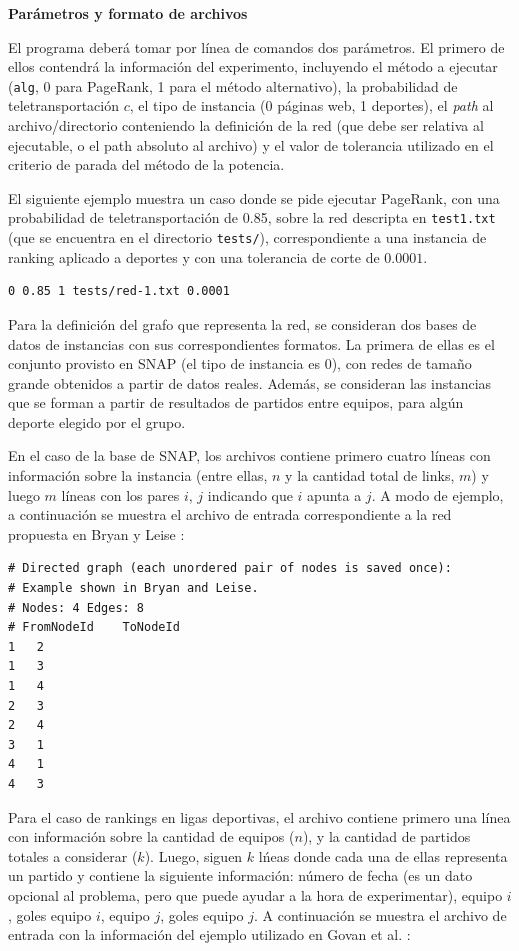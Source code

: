 \documentclass[11pt, a4paper]{article}
\begin{document}
\vskip 5pt
\noindent\textbf{Par\'ametros y formato de archivos}
\vskip 5pt

El programa deber\'a tomar por l\'inea de comandos dos par\'ametros. El primero de ellos contendr\'a la informaci\'on del experimento, incluyendo
el m\'etodo a ejecutar (\verb+alg+, 0 para PageRank, 1 para el m\'etodo alternativo), la probabilidad de teletransportaci\'on $c$, el tipo de instancia
(0 p\'aginas web, 1 deportes), el \emph{path} al archivo/directorio conteniendo la definici\'on de la red (que debe ser relativa al ejecutable, o el path 
absoluto al archivo) y el valor de tolerancia utilizado en el criterio de parada del m\'etodo de la potencia. 

El siguiente ejemplo muestra un caso donde se pide ejecutar PageRank, con una probabilidad de teletransportaci\'on de 0.85, sobre la red descripta en 
\verb+test1.txt+ (que se encuentra en el directorio \verb+tests/+), correspondiente a una instancia de ranking aplicado a deportes y con una tolerancia 
de corte de $0.0001$.
\begin{verbatim}
0 0.85 1 tests/red-1.txt 0.0001
\end{verbatim}

Para la definici\'on del grafo que representa la red, se consideran dos bases de datos de instancias con sus correspondientes formatos. La primera
de ellas es el conjunto provisto en SNAP \cite{SNAP} (el tipo de instancia es 0), con redes de tama\~no grande obtenidos a partir de datos reales. Adem\'as, 
se consideran las instancias que se forman a partir de resultados de partidos entre equipos, para alg\'un deporte elegido por el grupo. 

En el caso de la base de SNAP, los archivos contiene primero cuatro l\'ineas con informaci\'on sobre la instancia (entre ellas, $n$ y la cantidad
total de links, $m$) y luego $m$ l\'ineas con los pares $i$, $j$ indicando que $i$ apunta a $j$. A modo de ejemplo, a continuaci\'on se muestra el 
archivo de entrada correspondiente a la red propuesta en Bryan y Leise \cite[Figura 1]{Bryan2006}: 

\begin{verbatim}
# Directed graph (each unordered pair of nodes is saved once): 
# Example shown in Bryan and Leise.
# Nodes: 4 Edges: 8 
# FromNodeId    ToNodeId
1   2
1   3
1   4
2   3
2   4
3   1
4   1
4   3
\end{verbatim}

Para el caso de rankings en ligas deportivas, el archivo contiene primero una l\'inea con informaci\'on sobre la cantidad de equipos ($n$), y la cantidad
de partidos totales a considerar ($k$). Luego, siguen $k$ l\'neas donde cada una de ellas representa un partido y contiene la siguiente informaci\'on: 
n\'umero de fecha (es un dato opcional al problema, pero que puede ayudar a la hora de experimentar), equipo $i$, goles equipo $i$, equipo $j$, goles equipo $j$.
A continuaci\'on se muestra el archivo de entrada con la informaci\'on del ejemplo utilizado en Govan et al. \cite{Govan2008}:
\end{document}
